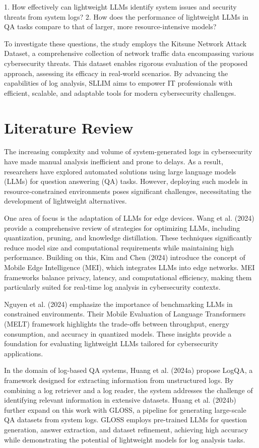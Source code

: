 \documentclass[11pt]{article}
\begin{document}
1. How effectively can lightweight LLMs identify system issues and security threats from system logs?
2. How does the performance of lightweight LLMs in QA tasks compare to that of larger, more resource-intensive models?

To investigate these questions, the study employs the Kitsune Network Attack Dataset, a comprehensive collection of network traffic data encompassing various cybersecurity threats. This dataset enables rigorous evaluation of the proposed approach, assessing its efficacy in real-world scenarios. By advancing the capabilities of log analysis, SLLIM aims to empower IT professionals with efficient, scalable, and adaptable tools for modern cybersecurity challenges.
\section{Literature Review}
The increasing complexity and volume of system-generated logs in cybersecurity have made manual analysis inefficient and prone to delays. As a result, researchers have explored automated solutions using large language models (LLMs) for question answering (QA) tasks. However, deploying such models in resource-constrained environments poses significant challenges, necessitating the development of lightweight alternatives.

One area of focus is the adaptation of LLMs for edge devices. Wang et al. (2024) provide a comprehensive review of strategies for optimizing LLMs, including quantization, pruning, and knowledge distillation. These techniques significantly reduce model size and computational requirements while maintaining high performance. Building on this, Kim and Chen (2024) introduce the concept of Mobile Edge Intelligence (MEI), which integrates LLMs into edge networks. MEI frameworks balance privacy, latency, and computational efficiency, making them particularly suited for real-time log analysis in cybersecurity contexts.

Nguyen et al. (2024) emphasize the importance of benchmarking LLMs in constrained environments. Their Mobile Evaluation of Language Transformers (MELT) framework highlights the trade-offs between throughput, energy consumption, and accuracy in quantized models. These insights provide a foundation for evaluating lightweight LLMs tailored for cybersecurity applications.

In the domain of log-based QA systems, Huang et al. (2024a) propose LogQA, a framework designed for extracting information from unstructured logs. By combining a log retriever and a log reader, the system addresses the challenge of identifying relevant information in extensive datasets. Huang et al. (2024b) further expand on this work with GLOSS, a pipeline for generating large-scale QA datasets from system logs. GLOSS employs pre-trained LLMs for question generation, answer extraction, and dataset refinement, achieving high accuracy while demonstrating the potential of lightweight models for log analysis tasks.
\end{document}
